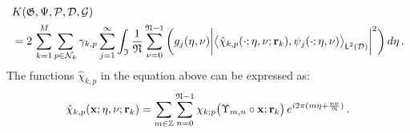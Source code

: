 \documentclass[preprint,12pt, 3p, sort&compress]{elsarticle}
\begin{document}
\begin{align}
\nonumber
&K(\mathfrak{G}, \Psi, {\cal P}, {\cal D}, {\cal G})\\
&= 2\,\sum_{k=1}^{M}\sum_{p \in {\cal N}_k}\gamma_{k,p}\sum_{j=1}^{\infty}\int_{\mathfrak{I}}\frac{1}{\mathfrak{N}}\sum_{\nu = 0}^{\mathfrak{N}-1}\bigg(g_j(\eta, \nu)\bigg\lvert{\big\langle{\hat{\chi}_{k,p}(\cdot;\eta, \nu;{\bf r}_k)},{\psi_j(\cdot; \eta, \nu)}\big\rangle}_{\textsf{L}^{2}_{}({{\cal D}})}\bigg\rvert^2\bigg)\,d\eta\,.
\end{align}
The functions $\hat{\chi}_{k,p}$ in the equation above can be expressed as:
\begin{align}
\label{eq:chi_hat_vnl}
\hat{\chi}_{k,p}({\bf x};\eta, \nu;{\bf r}_k) = \sum_{m\in \mathbb{Z}}\sum_{n=0}^{\mathfrak{N}-1}{\chi}_{k;p}\big( \Upsilon_{m,n}\circ {\bf x};{\bf r}_k\big)\,e^{i2\pi (m\eta + \frac{n\nu}{\mathfrak{N}})}\,.
\end{align}
\end{document}

